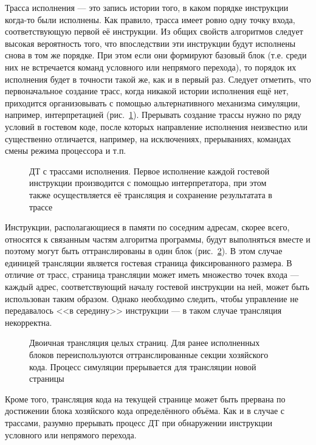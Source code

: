 \begin{enumerate*}
    
\item Трасса исполнения --- это запись истории того, в каком порядке инструкции когда-то были исполнены. Как правило, трасса имеет ровно одну точку входа, соответствующую первой её инструкции. Из общих свойств алгоритмов следует высокая вероятность того, что впоследствии эти инструкции будут исполнены снова в том же порядке. При этом если они формируют базовый блок (т.е. среди них не встречается команд условного или непрямого перехода), то порядок их исполнения будет в точности такой же, как и в первый раз. Следует отметить, что первоначальное создание трасс, когда никакой истории исполнения ещё нет, приходится организовывать с помощью альтернативного механизма симуляции, например, интерпретацией (рис.~\ref{fig:bt-traces}). Прерывать создание трассы нужно по ряду условий в гостевом коде, после которых направление исполнения неизвестно или существенно отличается, например, на исключениях, прерываниях, командах смены режима процессора и т.п. %

\begin{figure}[htbp]
    \centering
    \caption[ДТ с трассами исполнения]{ДТ с трассами исполнения. Первое исполнение каждой гостевой инструкции производится с помощью интерпретатора, при этом также осуществляется её трансляция и сохранение результатата в трассе}
    \label{fig:bt-traces}
\end{figure}

\item Инструкции, располагающиеся в памяти по соседним адресам, скорее всего, относятся к связанным частям алгоритма программы, будут выполняться вместе и поэтому могут быть оттранслированы в один блок (рис.~\ref{fig:bt-pages}). В этом случае единицей трансляции является гостевая страница фиксированного размера. В отличие от трасс, страница трансляции может иметь множество точек входа --- каждый адрес, соответствующий началу гостевой инструкции на ней, может быть использован таким образом. Однако необходимо следить, чтобы управление не передавалось <<в середину>> инструкции --- в таком случае трансляция некорректна.

\begin{figure}[htb]
    \centering
    \caption[Двоичная трансляция целых страниц]{Двоичная трансляция целых страниц. Для ранее исполненных блоков переиспользуются оттранслированные секции хозяйского кода. Процесс симуляции прерывается для трансляции новой страницы}
    \label{fig:bt-pages}
\end{figure}

Кроме того, трансляция кода на текущей странице может быть прервана по достижении блока хозяйского кода определённого объёма. Как и в случае с трассами, разумно прерывать процесс ДТ при обнаружении инструкции условного или непрямого перехода. 

\end{enumerate*}

